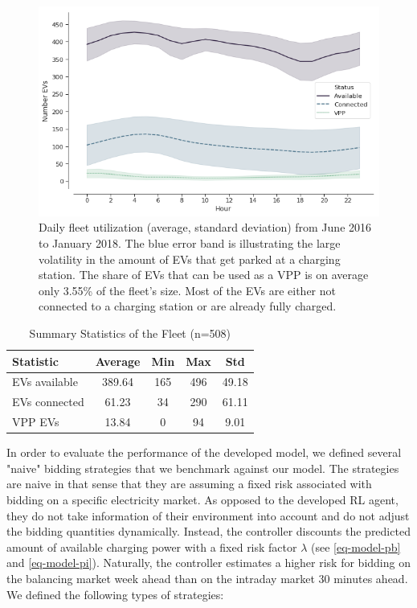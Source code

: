 \documentclass[a4paper, 12pt]{article}
\begin{document}
\begin{figure}[h]
\centering
\includegraphics[width=1\linewidth]{fig/fleet-utilization.png}
\caption[Fleet Utilzation]{Daily fleet utilization (average, standard deviation) from June 2016 to January 2018. The blue error band is illustrating the large volatility in the amount of EVs that get parked at a charging station. The share of EVs that can be used as a VPP is on average only 3.55\% of the fleet's size. Most of the EVs are either not connected to a charging station or are already fully charged. \label{fig-fleet-utilization}}
\end{figure}

\begin{table}[htb]
\caption[Summary Statistics of the Fleet]{Summary Statistics of the Fleet (n=508) \label{table-sim-stats}}
\centering
\begin{tabular}{l|cccc}
\hline
\hline
Statistic & Average & Min & Max & Std\\
\hline
EVs available & 389.64 & 165 & 496 & 49.18\\
EVs connected & 61.23 & 34 & 290 & 61.11\\
VPP EVs & 13.84 & 0 & 94 & 9.01\\
\hline
\hline
\end{tabular}
\end{table}

In order to evaluate the performance of the developed model, we defined several
"naive" bidding strategies that we benchmark against our model. The strategies
are naive in that sense that they are assuming a fixed risk associated with
bidding on a specific electricity market. As opposed to the developed RL agent,
they do not take information of their environment into account and do not adjust
the bidding quantities dynamically. Instead, the controller discounts the
predicted amount of available charging power with a fixed risk factor \(\lambda\)
(see \eqref{eq-model-pb} and \eqref{eq-model-pi}). Naturally, the controller
estimates a higher risk for bidding on the balancing market week ahead than on
the intraday market 30 minutes ahead. We defined the following types of
strategies:
\end{document}
